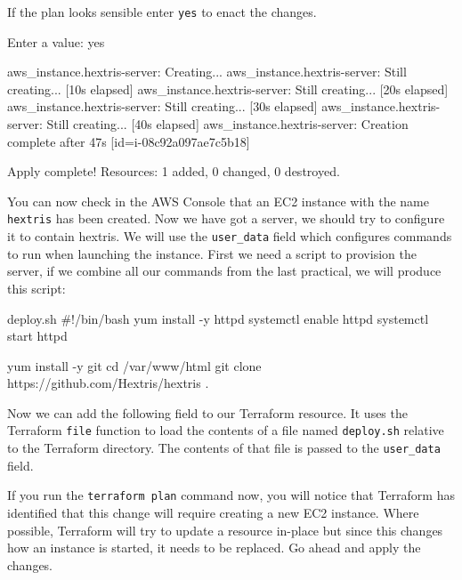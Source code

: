 \documentclass{csse4400}
\begin{document}
If the plan looks sensible enter \texttt{yes} to enact the changes.

\begin{code}[language=terraform-plan]{}
  Enter a value: yes

aws_instance.hextris-server: Creating...
aws_instance.hextris-server: Still creating... [10s elapsed]
aws_instance.hextris-server: Still creating... [20s elapsed]
aws_instance.hextris-server: Still creating... [30s elapsed]
aws_instance.hextris-server: Still creating... [40s elapsed]
aws_instance.hextris-server: Creation complete after 47s [id=i-08c92a097ae7c5b18]

Apply complete! Resources: 1 added, 0 changed, 0 destroyed.
\end{code}

You can now check in the AWS Console that an EC2 instance with the name \texttt{hextris} has been created.
Now we have got a server, we should try to configure it to contain hextris.
We will use the \texttt{user\_data} field which configures commands to run when launching the instance.
First we need a script to provision the server, if we combine all our commands from the last practical, we will produce this script:

\begin{code}[language=bash]{deploy.sh}
#!/bin/bash
yum install -y httpd
systemctl enable httpd
systemctl start httpd

yum install -y git
cd /var/www/html
git clone https://github.com/Hextris/hextris .  
\end{code}



Now we can add the following field to our Terraform resource.
It uses the Terraform \texttt{file} function to load the contents of a file named \texttt{deploy.sh} relative to the Terraform directory.
The contents of that file is passed to the \texttt{user\_data} field.


If you run the \texttt{terraform plan} command now,
you will notice that Terraform has identified that this change will require creating a new EC2 instance.
Where possible, Terraform will try to update a resource in-place but since this changes how an instance is started, it needs to be replaced.
Go ahead and apply the changes.
\end{document}
